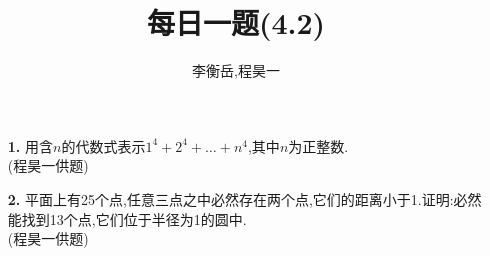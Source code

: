 \documentclass[UTF8]{ctexart}
\title{每日一题(4.2)}
\author{李衡岳,程昊一}
\begin{document}
\maketitle
\begin{itemize}
\item[\textbf{1.}]用含$n$的代数式表示$1^4+2^4+\dots+n^4$,其中$n$为正整数.\\
{(程昊一供题)}
\item[\textbf{2.}]平面上有25个点,任意三点之中必然存在两个点,它们的距离小于1.证明:必然能找到13个点,它们位于半径为1的圆中.\\
{(程昊一供题)}

\end{itemize}
\end{document}
